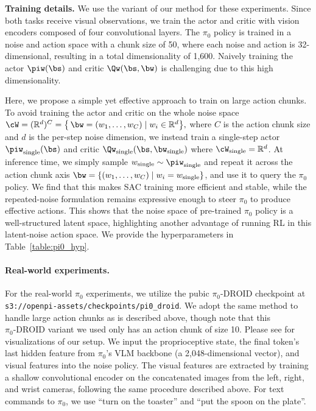 \textbf{Training details.} We use the \algnamesac variant of our method for these experiments. Since both tasks receive visual observations, we train the actor and critic with vision encoders composed of four convolutional layers. 
The $\pi_0$ policy is trained in a noise and action space with a chunk size of 50, where each noise and action is 32-dimensional, resulting in a total dimensionality of 1,600. Naively training the actor $\piw(\bs)$ and critic $\Qw(\bs,\bw)$ is challenging due to this high dimensionality. 

Here, we propose a simple yet effective approach to train \algnamesac on large action chunks. To avoid training the actor and critic on the whole noise space $\cW = (\mathbb{R}^d)^C = \bigl\{\, \bw = (w_1,\dots,w_C)\mid w_i \in \mathbb{R}^d\bigr\},$ where $C$ is the action chunk size and $d$ is the per-step noise dimension, we instead train a single-step actor $\piw_\text{single}(\bs)$ and critic $\Qw_\text{single}(\bs,\bw_\text{single})$ where $\cW_\text{single} = \mathbb{R}^d$. At inference time, we simply sample $w_\text{single} \sim \piw_\text{single}$ and repeat it across the action chunk axis $\bw = \{(w_1,\dots,w_C)\mid w_i = w_\text{single} \}$, and use it to query the $\pi_0$ policy. We find that this makes SAC training more efficient and stable, while the repeated-noise formulation remains expressive enough to steer $\pi_0$ to produce effective actions. This shows that the noise space of pre-trained $\pi_0$ policy is a well-structured latent space, highlighting another advantage of running RL in this latent-noise action space. We provide the hyperparameters in Table~\ref{table:pi0_hyp}.

\paragraph{Real-world experiments.}
For the real-world $\pi_0$ experiments, we utilize the pubic $\pi_0\text{-DROID}$ checkpoint at \texttt{s3://openpi-assets/checkpoints/pi0\_droid}. We adopt the same method to handle large action chunks as is described above, though note that this $\pi_0\text{-DROID}$ variant we used only has an action chunk of size 10. Please see  for visualizations of our setup. We input the proprioceptive state, the final token’s last hidden feature from $\pi_0$’s VLM backbone (a 2,048-dimensional vector), and visual features into the noise policy. The visual features are extracted by training a shallow convolutional encoder on the concatenated images from the left, right, and wrist cameras, following the same procedure described above.
For text commands to $\pi_0$, we use ``turn on the toaster'' and ``put the spoon on the plate''.

